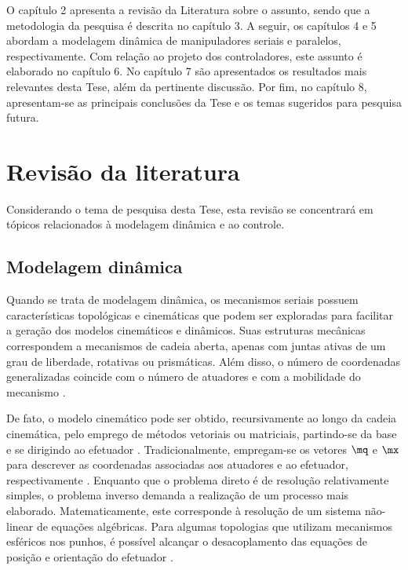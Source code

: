 \documentclass[]{politex}
\begin{document}
O capítulo 2 apresenta a revisão da Literatura sobre o assunto, sendo que a metodologia da pesquisa é descrita no capítulo 3. A seguir, os capítulos 4 e 5 abordam a modelagem dinâmica de manipuladores seriais e paralelos, respectivamente. Com relação ao projeto dos controladores, este assunto é elaborado no capítulo 6. No capítulo 7 são apresentados os resultados mais relevantes desta Tese, além da pertinente discussão. Por fim, no capítulo 8, apresentam-se as principais conclusões da Tese e os temas sugeridos para pesquisa futura.

\chapter{Revisão da literatura}\label{revision}

Considerando o tema de pesquisa desta Tese, esta revisão se concentrará em tópicos relacionados à modelagem dinâmica e ao controle.


\section{Modelagem dinâmica}

Quando se trata de modelagem dinâmica, os mecanismos seriais possuem características topológicas e cinemáticas que podem ser exploradas para facilitar a geração dos modelos cinemáticos e dinâmicos. Suas estruturas mecânicas correspondem a mecanismos de cadeia aberta, apenas com juntas ativas de um grau de liberdade, rotativas ou prismáticas. Além disso, o número de coordenadas generalizadas coincide com o número de atuadores e com a mobilidade do mecanismo \cite{Craig}. 

De fato, o modelo cinemático pode ser obtido, recursivamente ao longo da cadeia cinemática, pelo emprego de métodos vetoriais ou matriciais, partindo-se da base e se dirigindo ao efetuador \cite{Siciliano}. Tradicionalmente, empregam-se os vetores $\mq$ e $\mx$ para descrever as coordenadas associadas aos atuadores e ao efetuador, respectivamente \cite{Cabral, Carvalho}. Enquanto que o problema direto é de resolução relativamente simples, o problema inverso demanda a realização de um processo mais elaborado. Matematicamente, este corresponde à resolução de um sistema não-linear de equações algébricas. Para algumas topologias que utilizam mecanismos esféricos nos punhos, é possível alcançar o desacoplamento das equações de posição e orientação do efetuador \cite{Waldron}.
\end{document}
